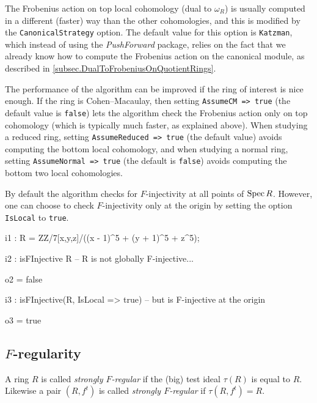\documentclass{amsart}
\begin{document}
The Frobenius action on top local cohomology (dual to $\omega_R$) is usually computed in a different (faster) way than the other cohomologies, and this is modified by the \texttt{CanonicalStrategy} option.
The default value for this option is \texttt{Katzman}, which instead of using the \emph{PushForward} package, relies on the fact that we already know how to compute the Frobenius action on the canonical module, as described in \autoref{subsec.DualToFrobeniusOnQuotientRings}.

The performance of the algorithm can be improved if the ring of interest is
nice enough. If the ring is Cohen--Macaulay, then setting \texttt{AssumeCM =>
true} (the default value is \texttt{false}) lets the algorithm check the Frobenius action only on top cohomology
(which is typically much faster, as explained above).
When studying a reduced ring,  setting \texttt{AssumeReduced => true} (the default value) avoids
computing the bottom local cohomology, and when studying a normal ring, setting
\texttt{AssumeNormal => true} (the default is \texttt{false}) avoids computing the bottom two local
cohomologies.

By default the algorithm checks for $F$-injectivity at all points of $\operatorname{{Spec}} R$.  However, one
can choose to check $F$-injectivity only at the origin by setting the
option \texttt{IsLocal} to  \texttt{true}.

\medskip
{\small{}
\begin{MyVerbatim}
i1 : R = ZZ/7[x,y,z]/((x - 1)^5 + (y + 1)^5 + z^5);

i2 : isFInjective R -- R is not globally F-injective...

o2 = false

i3 : isFInjective(R, IsLocal => true) -- but is F-injective at the origin

o3 = true
\end{MyVerbatim}
}\medskip

\subsection{$F$-regularity}

\begin{definition}
A ring $R$ is called \emph{strongly $F$-regular} if the (big) test ideal $\tau(R)$ is equal to $R$.  Likewise a pair $(R, f^t)$ is called \emph{strongly $F$-regular} if $\tau(R, f^t) = R$.
\end{definition}
\end{document}
